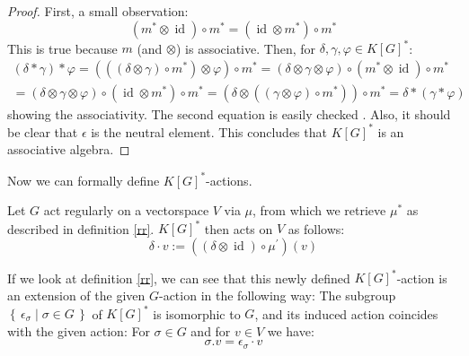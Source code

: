 \begin{proof}
  First, a small observation:
  \begin{equation}
    \left(m^\ast \otimes \operatorname{id} \right) \circ m^\ast = \left( \operatorname{id} \otimes m^\ast \right) \circ m^\ast
  \end{equation}
  This is true because $m$ (and $ \otimes $) is associative.
  Then, for $\delta, \gamma, \varphi \in K \left\lbrack G \right\rbrack^\ast$:
  \begin{equation}
    \begin{aligned}
      \left( \delta \ast \gamma \right) \ast \varphi
      = \left( \left( \left( \delta \otimes \gamma \right) \circ m^\ast \right) \otimes \varphi \right) \circ m^\ast
      = \left( \delta \otimes \gamma \otimes \varphi \right) \circ \left( m^\ast \otimes \operatorname{id} \right) \circ m^\ast \\
      = \left( \delta \otimes \gamma \otimes \varphi \right) \circ \left( \operatorname{id} \otimes m^\ast \right) \circ m^\ast
      = \left( \delta \otimes \left( \left( \gamma \otimes \varphi \right) \circ m^\ast \right) \right) \circ m^\ast
      = \delta \ast \left( \gamma \ast \varphi \right)
    \end{aligned}
  \end{equation}
  showing the associativity.
  The second equation is easily checked %
  .
  Also, it should be clear that $\epsilon$ is the neutral element.
  This concludes that $K \left\lbrack G \right\rbrack^\ast$ is an associative algebra.
\end{proof}

Now we can formally define $K [G]^\ast$-actions.

\begin{definition}\label{da}
  Let $G$ act regularly on a vectorspace $V$ via $\mu$, from which we retrieve $\mu^\ast$ as described in definition \ref{rr}.  $K[G]^\ast$ then acts on $V$ as follows:
  \begin{equation}
    \delta \cdot v := \left(\left( \delta \otimes \operatorname{id} \right) \circ \mu^\prime \right) \left(v\right)
  \end{equation}
\end{definition}

\begin{remark}
  If we look at definition \ref{rr}, we can see that this newly defined $K[G]^\ast$-action is an extension of the given $G$-action in the following way:
  The subgroup $\left\{\, \epsilon_\sigma \mid \sigma \in G \,\right\}$ of $K[G]^\ast$ is isomorphic to $G$, and its induced action coincides with the given action:
  For $\sigma \in G$ and for $v \in V$ we have:
  \begin{equation}
    \sigma . v = \epsilon_\sigma \cdot v
  \end{equation}
\end{remark}

